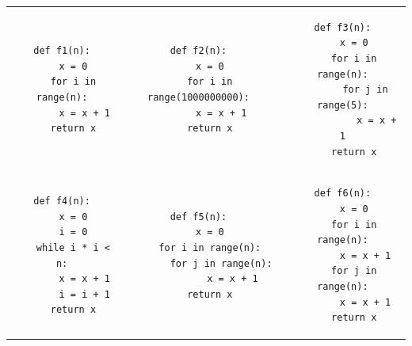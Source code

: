 \documentclass[11pt,a4paper]{exam}
\begin{document}
\begin{questions}
\begin{spacing}{1}
		\newcommand{\lgcode}{0.31}
		
		\noindent
		\begin{tabular}{c c c}
			\begin{minipage}{\lgcode\linewidth}
				\begin{verbatim}
def f1(n):
    x = 0
    for i in range(n):
        x = x + 1
    return x
				\end{verbatim}
			\end{minipage}
			&
			\begin{minipage}{\lgcode\linewidth}
				\begin{verbatim}
def f2(n):
    x = 0
    for i in range(1000000000):
        x = x + 1
    return x
				\end{verbatim}
			\end{minipage}
			&
			\begin{minipage}{\lgcode\linewidth}
				\begin{verbatim}
def f3(n):
    x = 0
    for i in range(n):
        for j in range(5):
            x = x + 1
    return x
				\end{verbatim}
			\end{minipage}
			\\
			\begin{minipage}{\lgcode\linewidth}
				\begin{verbatim}
def f4(n):
    x = 0
    i = 0
    while i * i < n:
        x = x + 1
        i = i + 1
    return x
				\end{verbatim}
			\end{minipage}
			&
			\begin{minipage}{\lgcode\linewidth}
				\begin{verbatim}
def f5(n):
    x = 0
    for i in range(n):
        for j in range(n):
            x = x + 1
    return x
				\end{verbatim}
			\end{minipage}
			&
			\begin{minipage}{\lgcode\linewidth}
				\begin{verbatim}
def f6(n):
    x = 0
    for i in range(n):
        x = x + 1
    for j in range(n):
        x = x + 1
    return x
				\end{verbatim}
			\end{minipage}
		\end{tabular}
		

\end{spacing}
\end{questions}
\end{document}
